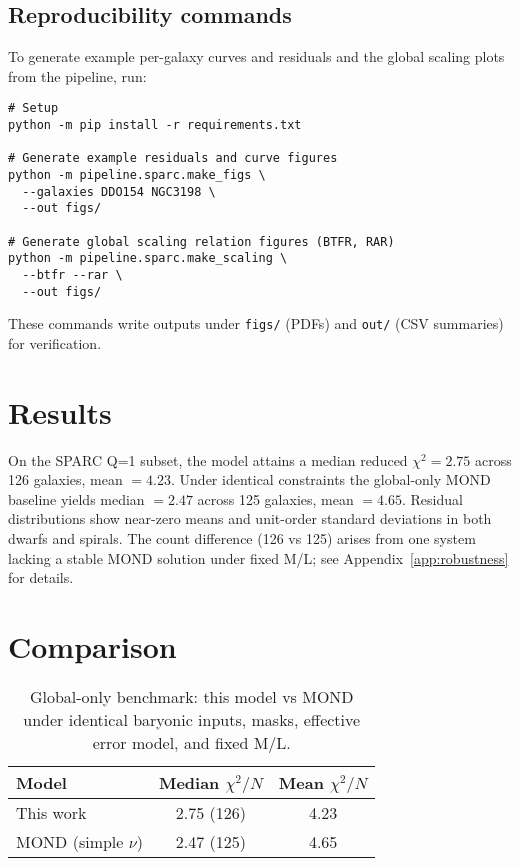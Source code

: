 \documentclass[twocolumn,prd,amsmath,amssymb,aps,superscriptaddress,nofootinbib]{revtex4-2}
\begin{document}
\subsection{Reproducibility commands}
To generate example per-galaxy curves and residuals and the global scaling plots from the pipeline, run:
\begin{verbatim}
# Setup
python -m pip install -r requirements.txt

# Generate example residuals and curve figures
python -m pipeline.sparc.make_figs \
  --galaxies DDO154 NGC3198 \
  --out figs/

# Generate global scaling relation figures (BTFR, RAR)
python -m pipeline.sparc.make_scaling \
  --btfr --rar \
  --out figs/
\end{verbatim}
These commands write outputs under \texttt{figs/} (PDFs) and \texttt{out/} (CSV summaries) for verification.

\section{Results}
On the SPARC Q=1 subset, the model attains a median reduced $\chi^2 = 2.75$ across 126 galaxies, mean $=4.23$. Under identical constraints the global-only MOND baseline yields median $=2.47$ across 125 galaxies, mean $=4.65$. Residual distributions show near-zero means and unit-order standard deviations in both dwarfs and spirals. The count difference (126 vs 125) arises from one system lacking a stable MOND solution under fixed M/L; see Appendix~\ref{app:robustness} for details.


\section{Comparison}
\begin{table}[h]
  \centering
  \caption{Global-only benchmark: this model vs MOND under identical baryonic inputs, masks, effective error model, and fixed M/L.}
  \label{tab:compare_mond}
  \begin{tabular}{lcc}
    \toprule
    Model & Median $\chi^2/N$ & Mean $\chi^2/N$ \\
    \midrule
    This work & 2.75 (126) & 4.23 \\
    MOND (simple $\nu$) & 2.47 (125) & 4.65 \\
    \bottomrule
  \end{tabular}
\end{table}
\end{document}
